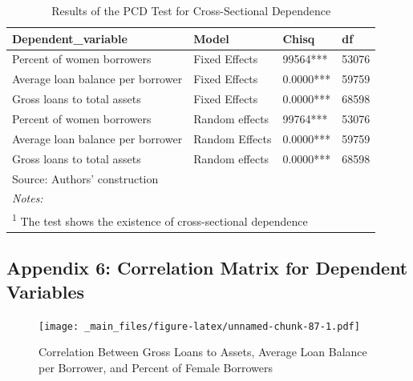 \documentclass[a4paper, nobind]{templates/ociamthesis}
\begin{document}
\begin{table}[!h]

\caption{\label{tab:unnamed-chunk-86}Results of the PCD Test for Cross-Sectional Dependence}
\centering
\fontsize{9}{11}\selectfont
\begin{tabular}[t]{llll}
\toprule
Dependent\_variable & Model & Chisq & df\\
\midrule
Percent of women borrowers & Fixed Effects & 99564*** & 53076\\
Average loan balance per borrower & Fixed Effects & 0.0000*** & 59759\\
Gross loans to total assets & Fixed Effects & 0.0000*** & 68598\\
Percent of women borrowers & Random effects & 99764*** & 53076\\
Average loan balance per borrower & Random Effects & 0.0000*** & 59759\\
\addlinespace
Gross loans to total assets & Random effects & 0.0000*** & 68598\\
\bottomrule
\multicolumn{4}{l}{\rule{0pt}{1em}Source: Authors' construction}\\
\multicolumn{4}{l}{\rule{0pt}{1em}\textit{Notes: }}\\
\multicolumn{4}{l}{\rule{0pt}{1em}\textsuperscript{1} The test shows the existence of cross-sectional dependence}\\
\end{tabular}
\end{table}

\newpage

\begin{landscape}

\hypertarget{appendix-6-correlation-matrix-for-dependent-variables}{%
\subsection{Appendix 6: Correlation Matrix for Dependent Variables}\label{appendix-6-correlation-matrix-for-dependent-variables}}

\begin{figure}
\centering
\texttt{[image: \_main\_files/figure-latex/unnamed-chunk-87-1.pdf]}
\caption{\label{fig:unnamed-chunk-87}Correlation Between Gross Loans to Assets, Average Loan Balance per Borrower, and Percent of Female Borrowers}
\end{figure}

\end{landscape}
\end{document}
